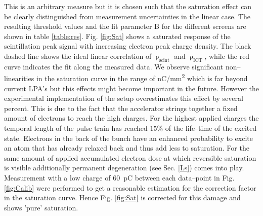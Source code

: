 \documentclass[%
reprint,
amsmath,
amssymb,
aip,
rsi, 
numerical,
floatfix,
]{revtex4-1}
\begin{document}
This is an arbitrary measure but it is chosen such that the saturation effect can be clearly distinguished from measurement uncertainties in the linear case. 
The resulting threshold values and the fit parameter B for the different screens are shown in table \ref{table:res}.
Fig. \ref{fig:Sat} shows a saturated response of the scintillation peak signal with increasing electron peak charge density. 
The black dashed line shows the ideal linear correlation of $\uprho_{\text{scint}}$ and $\uprho_{\text{ICT}}$, while the red curve indicates the fit along the measured data. 
We observe significant non--linearities in the saturation curve in the range of \si[per-mode=symbol]{\nano\coulomb \per \square\milli\meter} which is far beyond current LPA's but this effects might become important in the future. 
However the experimental implementation of the setup overestimates this effect by several percent. 
This is due to the fact that the accelerator strings together a fixed amount of electrons to reach the high charges.
For the highest applied charges the temporal length of the pulse train has reached $15\%$ of the life--time of the excited state.
Electrons in the back of the bunch have an enhanced probability to excite an atom that has already relaxed back and thus add less to saturation.
For the same amount of applied accumulated electron dose at which reversible saturation is visible additionally permanent degeneration (see Sec. \ref{Ls}) comes into play.
Measurement with a low charge of \SI{60}{\pico\coulomb} between each data--point in Fig. \ref{fig:Calib} were performed to get a reasonable estimation for the correction factor in the saturation curve.
Hence Fig. \ref{fig:Sat} is corrected for this damage and shows 'pure' saturation.      
\end{document}
